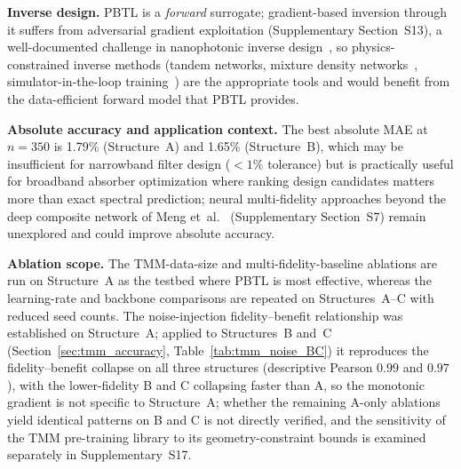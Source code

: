 \documentclass[a4paper,fleqn]{cas-sc}
\begin{document}
\textbf{Inverse design.} PBTL is a \emph{forward} surrogate; gradient-based inversion through it suffers from adversarial gradient exploitation (Supplementary Section~S13), a well-documented challenge in nanophotonic inverse design~\cite{liu2018training,peurifoy2018nanophotonic}, so physics-constrained inverse methods (tandem networks, mixture density networks~\cite{unni2020deep}, simulator-in-the-loop training~\cite{jiang2020simulator}) are the appropriate tools and would benefit from the data-efficient forward model that PBTL provides.

\textbf{Absolute accuracy and application context.} The best absolute MAE at $n=350$ is 1.79\% (Structure~A) and 1.65\% (Structure~B), which may be insufficient for narrowband filter design ($<1\%$ tolerance) but is practically useful for broadband absorber optimization where ranking design candidates matters more than exact spectral prediction; neural multi-fidelity approaches beyond the deep composite network of Meng et~al.~\cite{meng2020composite} (Supplementary Section~S7) remain unexplored and could improve absolute accuracy.

\textbf{Ablation scope.} The TMM-data-size and multi-fidelity-baseline ablations are run on Structure~A as the testbed where PBTL is most effective, whereas the learning-rate and backbone comparisons are repeated on Structures~A--C with reduced seed counts. The noise-injection fidelity--benefit relationship was established on Structure~A; applied to Structures~B and~C (Section~\ref{sec:tmm_accuracy}, Table~\ref{tab:tmm_noise_BC}) it reproduces the fidelity--benefit collapse on all three structures (descriptive Pearson $0.99$ and $0.97$), with the lower-fidelity B and C collapsing faster than A, so the monotonic gradient is not specific to Structure~A; whether the remaining A-only ablations yield identical patterns on B and C is not directly verified, and the sensitivity of the TMM pre-training library to its geometry-constraint bounds is examined separately in Supplementary~S17.
\end{document}
